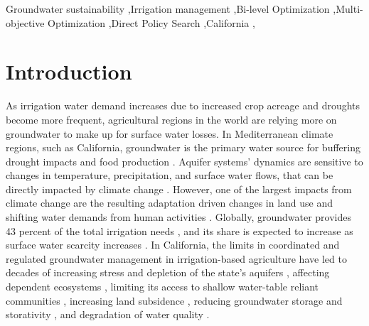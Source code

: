 \documentclass[a4paper,fleqn]{cas-sc}
\begin{document}
\begin{keywords}
Groundwater sustainability \sep Irrigation management \sep Bi-level Optimization \sep Multi-objective Optimization \sep Direct Policy Search \sep California \sep 
\end{keywords}


\maketitle

\section{Introduction}

As irrigation water demand increases due to increased crop acreage and droughts become more frequent, agricultural regions in the world are relying more on groundwater to make up for surface water losses. In Mediterranean climate regions, such as California, groundwater is the primary water source for buffering drought impacts and food production \citep{malmgren_groundwater_2022,priyan_issues_2021}. Aquifer systems’ dynamics are sensitive to changes in temperature, precipitation, and surface water flows, that can be directly impacted by climate change \citep{cuthbert_global_2019,wu_divergent_2020}. However, one of the largest impacts from climate change are the resulting adaptation driven changes in land use and shifting water demands from human activities \citep{taylor_ground_2013}. Globally, groundwater provides 43 percent of the total irrigation needs \citep{siebert_groundwater_2010}, and its share is expected to increase as surface water scarcity increases \citep{wada_nonsustainable_2012}. In California, the limits in coordinated and regulated groundwater management in irrigation-based agriculture have led to decades of increasing stress and depletion of the state's aquifers \citep{vasco_satellite-based_2019}, affecting dependent ecosystems \citep{bierkens_non-renewable_2019}, limiting its access to shallow water-table reliant communities \citep{pauloo_domestic_2020,perrone_dry_2017}, increasing land subsidence \citep{smith_groundwater_2020}, reducing groundwater storage and storativity \citep{alam_post-drought_2021}, and degradation of water quality \citep{levy_critical_2021}. 
\end{document}
